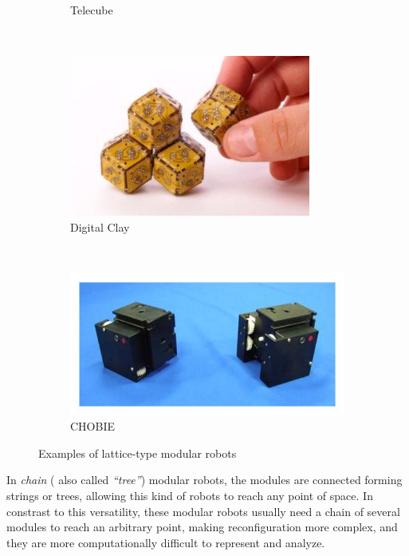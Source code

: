 \begin{figure}[h]
\begin{subfigure}[b]{0.18\textwidth}
                \caption{Telecube}
                \label{fig:telecube}
        \end{subfigure}
        ~
        \begin{subfigure}[b]{0.24\textwidth}
         	   \centering
                \includegraphics[width=\textwidth]{images/digitalclay.jpg}
                \caption{Digital Clay}
                \label{fig:digital_clay}
        \end{subfigure}        
        ~
        \begin{subfigure}[b]{0.28\textwidth}
         	   \centering
                \includegraphics[width=\textwidth]{images/CHOBIE.jpg}
                \caption{CHOBIE}
                \label{fig:chobie}
        \end{subfigure}
        \caption{Examples of lattice-type modular robots}\label{fig:config_lattice_examples}
\end{figure}

In \emph{chain} ( also called \emph{``tree''}) modular robots, the modules are connected forming strings or trees, allowing this kind of robots to reach any point of space. In constrast to this versatility, these modular robots usually need a chain of several modules to reach an arbitrary point, making reconfiguration more complex, and they are more computationally difficult to represent and analyze.\\

